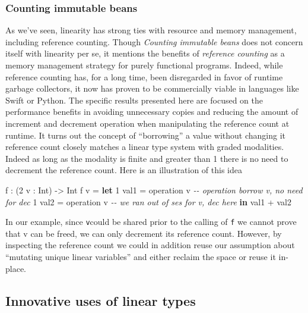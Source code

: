 \documentclass[
]{article}
\newenvironment{Shaded}{}{}
\newcommand{\CommentTok}[1]{\textcolor[rgb]{0.38,0.63,0.69}{\textit{#1}}}
\newcommand{\DataTypeTok}[1]{\textcolor[rgb]{0.56,0.13,0.00}{#1}}
\newcommand{\DecValTok}[1]{\textcolor[rgb]{0.25,0.63,0.44}{#1}}
\newcommand{\KeywordTok}[1]{\textcolor[rgb]{0.00,0.44,0.13}{\textbf{#1}}}
\newcommand{\NormalTok}[1]{#1}
\newcommand{\OperatorTok}[1]{\textcolor[rgb]{0.40,0.40,0.40}{#1}}
\newcommand{\OtherTok}[1]{\textcolor[rgb]{0.00,0.44,0.13}{#1}}
\begin{document}
\hypertarget{counting-immutable-beans}{%
\subsubsection{Counting immutable
beans}\label{counting-immutable-beans}}

As we've seen, linearity has strong ties with resource and memory
management, including reference counting. Though \emph{Counting
immutable beans} does not concern itself with linearity per se, it
mentions the benefits of \emph{reference counting} as a memory
management strategy for purely functional programs. Indeed, while
reference counting has, for a long time, been disregarded in favor of
runtime garbage collectors, it now has proven to be commercially viable
in languages like Swift or Python. The specific results presented here
are focused on the performance benefits in avoiding unnecessary copies
and reducing the amount of increment and decrement operation when
manipulating the reference count at runtime. It turns out the concept of
``borrowing'' a value without changing it reference count closely
matches a linear type system with graded modalities. Indeed as long as
the modality is finite and greater than 1 there is no need to decrement
the reference count. Here is an illustration of this idea

\begin{Shaded}
\begin{Highlighting}[]
\NormalTok{f }\OperatorTok{:}\NormalTok{ (}\DecValTok{2}\NormalTok{ v }\OperatorTok{:} \DataTypeTok{Int}\NormalTok{) }\OtherTok{{-}\textgreater{}} \DataTypeTok{Int}
\NormalTok{f v }\OtherTok{=} \KeywordTok{let} \DecValTok{1}\NormalTok{ val1 }\OtherTok{=}\NormalTok{ operation v }\CommentTok{{-}{-} operation borrow v, no need for dec}
          \DecValTok{1}\NormalTok{ val2 }\OtherTok{=}\NormalTok{ operation v }\CommentTok{{-}{-} we ran out of ses for v, dec here}
       \KeywordTok{in}\NormalTok{ val1 }\OperatorTok{+}\NormalTok{ val2}
\end{Highlighting}
\end{Shaded}

In our example, since \texttt{v}could be shared prior to the calling of
\texttt{f} we cannot prove that v can be freed, we can only decrement
its reference count. However, by inspecting the reference count we could
in addition reuse our assumption about ``mutating unique linear
variables'' and either reclaim the space or reuse it in-place.

\hypertarget{innovative-uses-of-linear-types}{%
\subsection{Innovative uses of linear
types}\label{innovative-uses-of-linear-types}}
\end{document}
